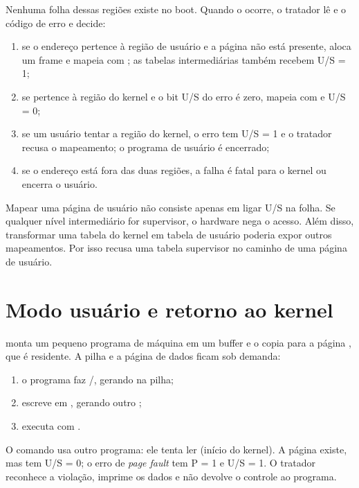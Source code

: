 Nenhuma folha dessas regi\~oes existe no boot. Quando o  ocorre,
o tratador l\^e  e o c\'odigo de erro e decide:

\begin{enumerate}
  \item se o endere\c{c}o pertence \`a regi\~ao de usu\'ario e a p\'agina
        n\~ao est\'a presente, aloca um frame e mapeia com
        ; as tabelas intermedi\'arias tamb\'em recebem U/S = 1;
  \item se pertence \`a regi\~ao do kernel e o bit U/S do erro \'e zero,
        mapeia com  e U/S = 0;
  \item se um usu\'ario tentar a regi\~ao do kernel, o erro tem U/S = 1 e o
        tratador recusa o mapeamento; o programa de usu\'ario \'e encerrado;
  \item se o endere\c{c}o est\'a fora das duas regi\~oes, a falha \'e fatal
        para o kernel ou encerra o usu\'ario.
\end{enumerate}

\begin{nota}
Mapear uma p\'agina de usu\'ario n\~ao consiste apenas em ligar U/S na folha.
Se qualquer n\'ivel intermedi\'ario for supervisor, o hardware nega o acesso.
Al\'em disso, transformar uma tabela do kernel em tabela de usu\'ario poderia
expor outros mapeamentos. Por isso  recusa uma tabela
supervisor no caminho de uma p\'agina de usu\'ario.
\end{nota}

\section{Modo usu\'ario e retorno ao kernel}

 monta um pequeno programa de m\'aquina em um buffer e o copia
para a p\'agina , que \'e residente. A pilha e a p\'agina de
dados ficam sob demanda:

\begin{enumerate}
  \item o programa faz /, gerando  na pilha;
  \item escreve em , gerando outro ;
  \item executa  com .
\end{enumerate}

O comando  usa outro programa: ele tenta ler
 (in\'icio do kernel). A p\'agina existe, mas tem
U/S = 0; o erro de \emph{page fault} tem P = 1 e U/S = 1. O tratador
reconhece a viola\c{c}\~ao, imprime os dados e n\~ao devolve o controle ao
programa.

